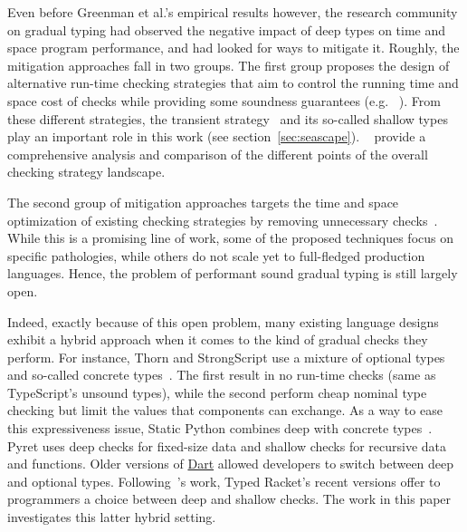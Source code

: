 Even before Greenman et al.'s empirical results however, the research
community on gradual typing had observed the negative impact of deep types
on time and space program performance, and had looked for ways to mitigate
it.  Roughly, the mitigation approaches fall in two groups. The first
group proposes the design of alternative run-time checking strategies that
aim to control the running time and space cost of checks while providing
some soundness guarantees (e.g.
~\citep{grmhn-vmil-2019,sgt-esop-2009,rmhn-ecoop-2019,glfd-pj-2022,lgmvpk-pj-2023,svctg-esop-2015,rat-oopsla-2017,sfrbcsb-popl-2014,rsfbv-popl-2015,coersion-passing-style}).
From these different strategies, the transient
strategy~\cite{vksb-dls-2014,vss-popl-2017,v-thesis-2019} and its
so-called shallow types play an important role in this work (see
section~\ref{sec:seascape}).  ~\citet{type-untyped} provide a
comprehensive analysis and comparison of the different points of the
overall checking strategy landscape.

The second group of mitigation approaches targets the time and space optimization of
existing checking strategies by removing unnecessary
checks~\cite{collapsible,corpse-reviver, kas-pldi-2019,grmhn-vmil-2019,
rat-oopsla-2017,pycket,bbst-oopsla-2017}. While this is a promising line
of work, some of the proposed techniques focus on specific pathologies,
while others do not scale yet to full-fledged production languages.
Hence, the problem of performant sound gradual typing is still largely
open.   

Indeed, exactly because of this open problem, many existing language
designs exhibit a hybrid approach when it comes to the kind of gradual
checks they perform. For instance, Thorn and StrongScript use a mixture of
optional types and so-called concrete
types~\citep{wzlov-popl-2010,rzv-ecoop-2015}. The first result in no
run-time checks (same as TypeScript's unsound types), while the second
perform cheap nominal type checking but limit the values that components
can exchange.  As a way to ease this expressiveness issue, Static Python
combines deep with concrete types~\citep{lgmvpk-pj-2023}.  Pyret uses deep
checks for fixed-size data and shallow checks for recursive data and
functions.  Older versions of
\href{https://medium.com/dartlang/dart-2-stable-and-the-dart-web-platform-3775d5f8eac7}{Dart}
allowed developers to switch between  deep and optional types.
Following~\citet{g-deep-shallow}'s work, Typed Racket's recent versions
offer to programmers a choice between deep and shallow checks. The work in
this paper investigates this latter hybrid setting. 

